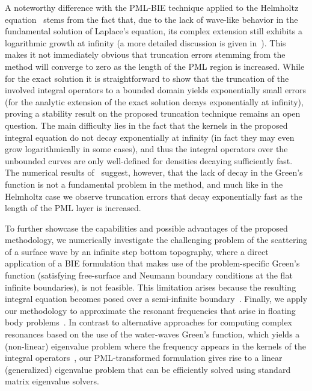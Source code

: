 \documentclass[review,hidelinks,onefignum,onetabnum]{siamart220329}
\begin{document}
A noteworthy difference with the PML-BIE technique applied to the Helmholtz equation~\cite{lu2018perfectly} stems from the fact that, due to the lack of wave-like behavior in the fundamental solution of Laplace's equation, its complex extension still exhibits a logarithmic growth at infinity (a more detailed discussion is given in~). This makes it not immediately obvious that truncation errors stemming from the method will converge to zero as the length of the PML region is increased. While for the exact solution it is straightforward to show that the truncation of the involved integral operators to a bounded domain yields exponentially small errors (for the analytic extension of the exact solution decays exponentially at infinity), proving a stability result on the proposed truncation technique remains an open question. The main difficulty lies in the fact that the kernels in the proposed integral equation do not decay exponentially at infinity (in fact they may even grow logarithmically in some cases), and thus the integral operators over the unbounded curves are only well-defined for densities decaying sufficiently fast. The numerical results of~ suggest, however, that the lack of decay in the Green's function is not a fundamental problem in the method, and much like in the Helmholtz case we observe truncation errors that decay exponentially fast as the length of the PML layer is increased.

To further showcase the capabilities and possible advantages of the proposed methodology, we numerically investigate the challenging problem of the scattering of a surface wave by an infinite step bottom topography, where a direct application of a BIE formulation that makes use of the problem-specific Green's function (satisfying free-surface and Neumann boundary conditions at the flat infinite boundaries), is not feasible. This limitation arises because the resulting integral equation becomes posed over a semi-infinite boundary~\cite{athanassoulis1999consistent,belibassakis2004three}. Finally, we apply our methodology to approximate the resonant frequencies that arise in floating body problems~\cite{Haz-Len-1993,mciver1996example}. In contrast to alternative approaches for computing complex resonances based on the use of the water-waves Green's function, which yields a (non-linear) eigenvalue problem where the frequency appears in the kernels of the integral operators~\cite{Haz-Len-1993}, our PML-transformed formulation gives rise to a linear (generalized) eigenvalue problem that can be efficiently solved using standard matrix eigenvalue solvers.
\end{document}
